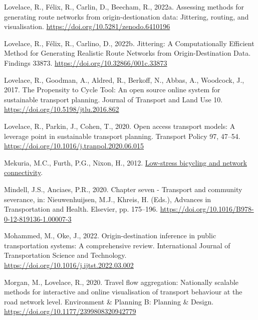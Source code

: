 \documentclass{isprs} %
\newlength{\cslhangindent}
\newlength{\cslentryspacingunit} %
\newenvironment{CSLReferences}[2] %
 {%
  \setlength{\parindent}{0pt}
  \ifodd #1
  \let\oldpar\par
  \def\par{\hangindent=\cslhangindent\oldpar}
  \fi
  \setlength{\parskip}{#2\cslentryspacingunit}
 }%
 {}
\begin{document}
\begin{CSLReferences}{0}{0}
\leavevmode{}%
Lovelace, R., Félix, R., Carlin, D., Beecham, R., 2022a. Assessing methods for generating route networks from origin-destionation data: Jittering, routing, and visualisation. \url{https://doi.org/10.5281/zenodo.6410196}

\leavevmode{}%
Lovelace, R., Félix, R., Carlino, D., 2022b. Jittering: {A Computationally Efficient Method} for {Generating Realistic Route Networks} from {Origin-Destination Data}. Findings 33873. \url{https://doi.org/10.32866/001c.33873}

\leavevmode{}%
Lovelace, R., Goodman, A., Aldred, R., Berkoff, N., Abbas, A., Woodcock, J., 2017. The {Propensity} to {Cycle Tool}: {An} open source online system for sustainable transport planning. Journal of Transport and Land Use 10. \url{https://doi.org/10.5198/jtlu.2016.862}

\leavevmode{}%
Lovelace, R., Parkin, J., Cohen, T., 2020. Open access transport models: {A} leverage point in sustainable transport planning. Transport Policy 97, 47--54. \url{https://doi.org/10.1016/j.tranpol.2020.06.015}

\leavevmode{}%
Mekuria, M.C., Furth, P.G., Nixon, H., 2012. \href{https://scholarworks.sjsu.edu/cgi/viewcontent.cgi?article=1073\&context=mti_publications}{Low-stress bicycling and network connectivity}.

\leavevmode{}%
Mindell, J.S., Anciaes, P.R., 2020. Chapter seven - {Transport} and community severance, in: Nieuwenhuijsen, M.J., Khreis, H. (Eds.), Advances in {Transportation} and {Health}. {Elsevier}, pp. 175--196. \url{https://doi.org/10.1016/B978-0-12-819136-1.00007-3}

\leavevmode{}%
Mohammed, M., Oke, J., 2022. Origin-destination inference in public transportation systems: {A} comprehensive review. International Journal of Transportation Science and Technology. \url{https://doi.org/10.1016/j.ijtst.2022.03.002}

\leavevmode{}%
Morgan, M., Lovelace, R., 2020. Travel flow aggregation: Nationally scalable methods for interactive and online visualisation of transport behaviour at the road network level. Environment \& Planning B: Planning \& Design. \url{https://doi.org/10.1177/2399808320942779}


\end{CSLReferences}
\end{document}
